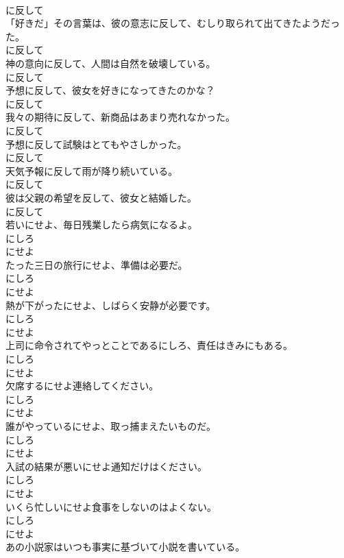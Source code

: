 \documentclass[8pt]{extreport}
\begin{document}
\begin{CJK}{UTF8}{min}
\\	に反して
\\	「好きだ」その言葉は、彼の意志に反して、むしり取られて出てきたようだった。	
\\	に反して
\\	神の意向に反して、人間は自然を破壊している。	
\\	に反して
\\	予想に反して、彼女を好きになってきたのかな？	
\\	に反して
\\	我々の期待に反して、新商品はあまり売れなかった。	
\\	に反して
\\	予想に反して試験はとてもやさしかった。	
\\	に反して
\\	天気予報に反して雨が降り続いている。	
\\	に反して
\\	彼は父親の希望を反して、彼女と結婚した。	
\\	に反して
\\	若いにせよ、毎日残業したら病気になるよ。	
\\	にしろ 
\\	にせよ
\\	たった三日の旅行にせよ、準備は必要だ。	
\\	にしろ 
\\	にせよ
\\	熱が下がったにせよ、しばらく安静が必要です。	
\\	にしろ 
\\	にせよ
\\	上司に命令されてやっとことであるにしろ、責任はきみにもある。	
\\	にしろ 
\\	にせよ
\\	欠席するにせよ連絡してください。	
\\	にしろ 
\\	にせよ
\\	誰がやっているにせよ、取っ捕まえたいものだ。	
\\	にしろ 
\\	にせよ
\\	入試の結果が悪いにせよ通知だけはください。	
\\	にしろ 
\\	にせよ
\\	いくら忙しいにせよ食事をしないのはよくない。	
\\	にしろ 
\\	にせよ
\\	あの小説家はいつも事実に基づいて小説を書いている。	

\end{CJK}
\end{document}
